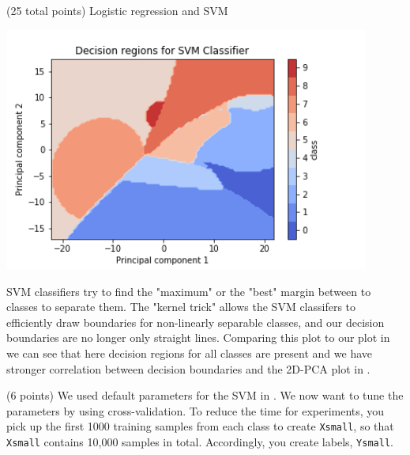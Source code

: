 \documentclass[12pt]{article}
\begin{document}
\begin{question}{(25 total points) Logistic regression and SVM}
\begin{subquestion}
      \begin{answerbox}{35em}
         \begin{center}
               \includegraphics[width=0.9\textwidth]{results/2_4.png}
         \end{center}
         SVM classifiers try to find the "maximum" or the "best" margin between to classes to separate them. The "kernel trick" allows the SVM classifers to efficiently draw boundaries for non-linearly separable classes, and our decision boundaries are no longer only straight lines. Comparing this plot to our plot in  we can see that here decision regions for all classes are present and we have stronger correlation between decision boundaries and the 2D-PCA plot in . 
      \end{answerbox}
  


   \end{subquestion}

   \begin{subquestion}{(6 points)
       We used default parameters for the SVM in .
       We now want to tune the parameters by using cross-validation.
       To reduce the time for experiments, you pick up the first 1000
       training samples from each class to create \texttt{Xsmall}, so that \texttt{Xsmall}
       contains 10,000 samples in total. Accordingly, you create
       labels, \texttt{Ysmall}.
     } \label{Q2.5}


   


\end{subquestion}
\end{question}
\end{document}

